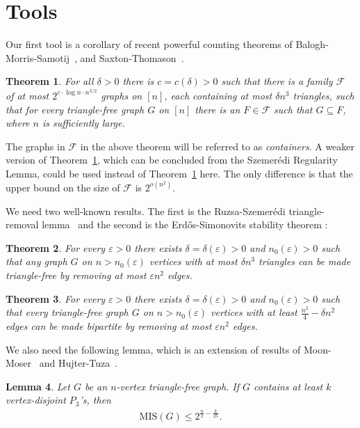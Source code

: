 \documentclass[12pt]{article}
\newtheorem{theorem}{Theorem}[section]
\newtheorem{lemma}[theorem]{Lemma}
\theoremstyle{definition}
\theoremstyle{definition}
\theoremstyle{definition}
\theoremstyle{definition}
\theoremstyle{definition}
\theoremstyle{definition}
\theoremstyle{definition}
\newcommand{\ep}{\varepsilon}
\newcommand{\cF}{\mathcal{F}}
\newcommand{\3}{\bf{3}}
\newcommand{\MIS}{\mathrm{MIS}}
\begin{document}
\section{Tools}\label{s_Tools}
Our first tool is  a corollary of recent powerful counting theorems of Balogh-Morris-Samotij~\cite[Theorem 2.2.]{Balogh}, and Saxton-Thomason~\cite{Saxton}.

\begin{theorem}\label{thm1} 
For all $\delta>0$ there is $c=c(\delta)>0$ such that there is a family $\cF$ of at most $2^{c\cdot \log n\cdot n^{3/2}}$ graphs on $[n]$, each containing at most $\delta n^3$ triangles, such that for every triangle-free graph $G$ on $[n]$ there is an $F\in \cF$ such that $G \subseteq  F$, where $n$ is sufficiently large.
\end{theorem}

\noindent
The graphs in $\cF$ in the above theorem will be referred to as \emph{containers}. A weaker version of Theorem~\ref{thm1}, which can be concluded from the Szemer\'{e}di Regularity Lemma, could be used instead of Theorem~\ref{thm1} here. The only difference is that the upper bound on the size of $\cF$ is $2^{o(n^2)}$.

We need two well-known results. The first is the Ruzsa-Szemer\'{e}di triangle-removal lemma~\cite{Ruzsa} and the second is the Erd\H{o}s-Simonovits stability theorem \cite{ES}:
\begin{theorem}\label{thm2}
For every $\ep>0$ there exists $\delta=\delta(\ep)>0$ and $n_0(\ep)>0$ such that any graph $G$ on $n>n_0(\ep)$ vertices with at most $\delta n^3$ triangles can be made triangle-free by removing at most $\ep n^2$ edges.
\end{theorem}

\begin{theorem}\label{thm3}
For every $\ep >0$ there exists $\delta=\delta(\ep)>0$ and $n_0(\ep)>0$ such that every triangle-free graph $G$ on $n>n_0(\ep)$ vertices with at least $\frac{n^2}{4}-\delta n^2$ edges can be made bipartite by removing at most $\ep n^2$ edges.
\end{theorem}

We also need the following lemma, which is an extension of results of Moon-Moser~\cite{MM} and Hujter-Tuza~\cite{HT}.

\begin{lemma}\label{lem-mis-p3}
Let $G$ be an $n$-vertex triangle-free graph. If $G$ contains at least $k$ vertex-disjoint $P_3$'s, then 
\begin{eqnarray}\label{eq-mis}
\MIS(G)\le 2^{\frac{n}{2}-\frac{k}{25}}.
\end{eqnarray}
\end{lemma}
\end{document}
